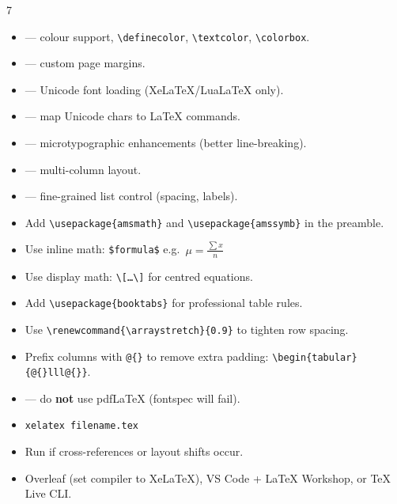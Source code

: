 \documentclass[a4paper,landscape]{article}
\begin{document}
\begin{multicols}{7}

\begin{itemize}
\item {} — colour support, \texttt{\textbackslash definecolor}, \texttt{\textbackslash textcolor}, \texttt{\textbackslash colorbox}.
\item {} — custom page margins.
\item {} — Unicode font loading (XeLaTeX/LuaLaTeX only).
\item {} — map Unicode chars to \LaTeX{} commands.
\item {} — microtypographic enhancements (better line-breaking).
\item {} — multi-column layout.
\item {} — fine-grained list control (spacing, labels).
\end{itemize}

\begin{itemize}
\item Add \texttt{\textbackslash usepackage\{amsmath\}} and \texttt{\textbackslash usepackage\{amssymb\}} in the preamble.
\item Use inline math: \texttt{\$formula\$} e.g.\ $\mu = \frac{\sum x}{n}$
\item Use display math: \texttt{\textbackslash[\ldots\textbackslash]} for centred equations.
\end{itemize}

\begin{itemize}
\item Add \texttt{\textbackslash usepackage\{booktabs\}} for professional table rules.
\item Use \texttt{\textbackslash renewcommand\{\textbackslash arraystretch\}\{0.9\}} to tighten row spacing.
\item Prefix columns with \texttt{@\{\}} to remove extra padding: \texttt{\textbackslash begin\{tabular\}\{@\{\}lll@\{\}\}}.
\end{itemize}



\begin{itemize}
\item {}  — do \textbf{not} use pdfLaTeX (fontspec will fail).
\item {} \texttt{xelatex filename.tex}
\item Run  if cross-references or layout shifts occur.
\item {} Overleaf (set compiler to XeLaTeX), VS Code + LaTeX Workshop, or TeX Live CLI.
\end{itemize}


\end{multicols}
\end{document}

